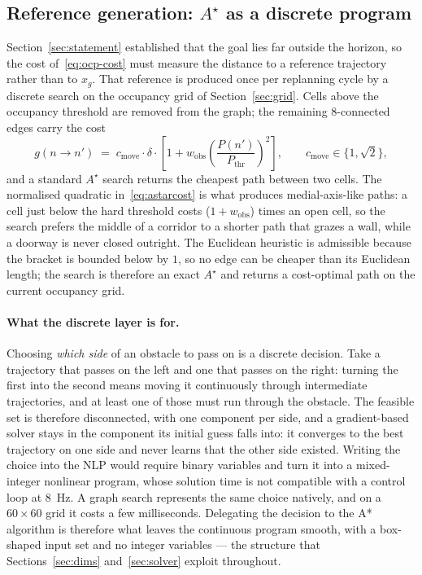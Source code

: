 \documentclass[11pt,a4paper]{article}
\newcommand{\astar}{$A^\star$}
\begin{document}
\subsection{Reference generation: \texorpdfstring{\astar{}}{A*} as a discrete program}
\label{sec:astar}

Section~\ref{sec:statement} established that the goal lies far outside the horizon, so the cost
of~\eqref{eq:ocp-cost} must measure the distance to a reference trajectory rather than to $x_g$. That
reference is produced once per replanning cycle by a discrete search on the occupancy grid of
Section~\ref{sec:grid}. Cells above the occupancy threshold are removed from the graph; the remaining
$8$-connected edges carry the cost
\begin{equation}
  g(n\rightarrow n') \;=\; c_{\mathrm{move}}\cdot\delta\cdot
  \left[1+w_{\mathrm{obs}}\left(\frac{P(n')}{P_{\mathrm{thr}}}\right)^{\!2}\right],
  \qquad c_{\mathrm{move}}\in\{1,\sqrt2\},
  \label{eq:astarcost}
\end{equation}
and a standard \astar{} search returns the cheapest path between two cells. The normalised quadratic
in~\eqref{eq:astarcost} is what produces medial-axis-like paths: a cell just below the hard threshold costs
($1+w_{\mathrm{obs}}$) times an open cell, so the search prefers the middle of a corridor to a shorter path
that grazes a wall, while a doorway is never closed outright. The Euclidean heuristic is admissible because
the bracket is bounded below by $1$, so no edge can be cheaper than its Euclidean length; the search is
therefore an exact \astar{} and returns a cost-optimal path on the current occupancy grid.

\paragraph{What the discrete layer is for.} Choosing \emph{which side} of an obstacle to pass on is a discrete decision. Take a trajectory that passes on the left and one that passes on the right: turning the first into the second means moving it continuously through intermediate trajectories, and at least one of those must run through the obstacle. The feasible set is therefore disconnected, with one component per side, and a gradient-based solver stays in the component its initial guess falls into: it converges to the best trajectory on one side and never learns that the other side existed. Writing the choice into the NLP would require binary variables and turn it into a mixed-integer nonlinear program, whose solution time is not compatible with a control loop at 8~Hz. A graph search represents the same choice natively, and on a $60\times60$
grid it costs a few milliseconds. Delegating the decision to the A* algorithm is therefore what leaves the continuous program
smooth, with a box-shaped input set and no integer variables --- the structure that
Sections~\ref{sec:dims} and~\ref{sec:solver} exploit throughout.
\end{document}
